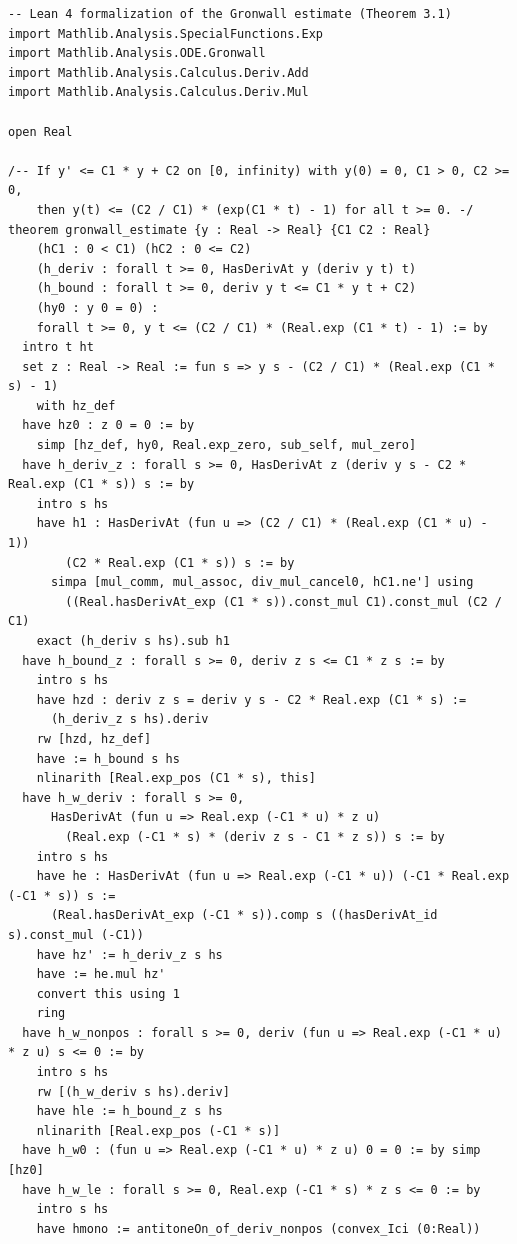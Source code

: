 \begin{lstlisting}[style=lean4, caption={Gronwall's inequality for the differential inequality $y' \le C_1 y + C_2$.}]
-- Lean 4 formalization of the Gronwall estimate (Theorem 3.1)
import Mathlib.Analysis.SpecialFunctions.Exp
import Mathlib.Analysis.ODE.Gronwall
import Mathlib.Analysis.Calculus.Deriv.Add
import Mathlib.Analysis.Calculus.Deriv.Mul

open Real

/-- If y' <= C1 * y + C2 on [0, infinity) with y(0) = 0, C1 > 0, C2 >= 0,
    then y(t) <= (C2 / C1) * (exp(C1 * t) - 1) for all t >= 0. -/
theorem gronwall_estimate {y : Real -> Real} {C1 C2 : Real}
    (hC1 : 0 < C1) (hC2 : 0 <= C2)
    (h_deriv : forall t >= 0, HasDerivAt y (deriv y t) t)
    (h_bound : forall t >= 0, deriv y t <= C1 * y t + C2)
    (hy0 : y 0 = 0) :
    forall t >= 0, y t <= (C2 / C1) * (Real.exp (C1 * t) - 1) := by
  intro t ht
  set z : Real -> Real := fun s => y s - (C2 / C1) * (Real.exp (C1 * s) - 1)
    with hz_def
  have hz0 : z 0 = 0 := by
    simp [hz_def, hy0, Real.exp_zero, sub_self, mul_zero]
  have h_deriv_z : forall s >= 0, HasDerivAt z (deriv y s - C2 * Real.exp (C1 * s)) s := by
    intro s hs
    have h1 : HasDerivAt (fun u => (C2 / C1) * (Real.exp (C1 * u) - 1))
        (C2 * Real.exp (C1 * s)) s := by
      simpa [mul_comm, mul_assoc, div_mul_cancel0, hC1.ne'] using
        ((Real.hasDerivAt_exp (C1 * s)).const_mul C1).const_mul (C2 / C1)
    exact (h_deriv s hs).sub h1
  have h_bound_z : forall s >= 0, deriv z s <= C1 * z s := by
    intro s hs
    have hzd : deriv z s = deriv y s - C2 * Real.exp (C1 * s) :=
      (h_deriv_z s hs).deriv
    rw [hzd, hz_def]
    have := h_bound s hs
    nlinarith [Real.exp_pos (C1 * s), this]
  have h_w_deriv : forall s >= 0,
      HasDerivAt (fun u => Real.exp (-C1 * u) * z u)
        (Real.exp (-C1 * s) * (deriv z s - C1 * z s)) s := by
    intro s hs
    have he : HasDerivAt (fun u => Real.exp (-C1 * u)) (-C1 * Real.exp (-C1 * s)) s :=
      (Real.hasDerivAt_exp (-C1 * s)).comp s ((hasDerivAt_id s).const_mul (-C1))
    have hz' := h_deriv_z s hs
    have := he.mul hz'
    convert this using 1
    ring
  have h_w_nonpos : forall s >= 0, deriv (fun u => Real.exp (-C1 * u) * z u) s <= 0 := by
    intro s hs
    rw [(h_w_deriv s hs).deriv]
    have hle := h_bound_z s hs
    nlinarith [Real.exp_pos (-C1 * s)]
  have h_w0 : (fun u => Real.exp (-C1 * u) * z u) 0 = 0 := by simp [hz0]
  have h_w_le : forall s >= 0, Real.exp (-C1 * s) * z s <= 0 := by
    intro s hs
    have hmono := antitoneOn_of_deriv_nonpos (convex_Ici (0:Real))

\end{lstlisting}
